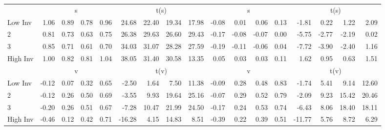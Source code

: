 \begin{table}[!ht]
\begin{tabular}{lrrrrrrrrrrrrrrrr}
  
    
      & \multicolumn{4}{c}{s} & \multicolumn{4}{c}{t(s)}
    
      & \multicolumn{4}{c}{s} & \multicolumn{4}{c}{t(s)}
    
    \\
      \cmidrule(r){2-5} \cmidrule(r){6-9} \cmidrule(r){10-13} \cmidrule(r){14-17}

    Low Inv   & 1.06  & 0.89  & 0.78  & 0.96  & 24.68  & 22.40  & 19.34  & 17.98  & -0.08  & 0.01  & 0.06  & 0.13  & -1.81  & 0.22  & 1.22  & 2.09  \\
           2  & 0.81  & 0.73  & 0.63  & 0.75  & 26.38  & 29.63  & 26.60  & 29.43  & -0.17  & -0.08  & -0.07  & 0.00  & -5.75  & -2.77  & -2.19  & 0.02  \\
           3  & 0.85  & 0.71  & 0.61  & 0.70  & 34.03  & 31.07  & 28.28  & 27.59  & -0.19  & -0.11  & -0.06  & 0.04  & -7.72  & -3.90  & -2.40  & 1.16  \\
    High Inv  & 1.00  & 0.82  & 0.81  & 1.04  & 38.05  & 31.40  & 30.58  & 13.35  & 0.05  & 0.03  & 0.03  & 0.11  & 1.62  & 0.95  & 0.63  & 1.51  \\

  
    
      & \multicolumn{4}{c}{v} & \multicolumn{4}{c}{t(v)}
    
      & \multicolumn{4}{c}{v} & \multicolumn{4}{c}{t(v)}
    
    \\
      \cmidrule(r){2-5} \cmidrule(r){6-9} \cmidrule(r){10-13} \cmidrule(r){14-17}

    Low Inv   & -0.12  & 0.07  & 0.32  & 0.65  & -2.50  & 1.64  & 7.50  & 11.38  & -0.09  & 0.28  & 0.48  & 0.83  & -1.74  & 5.41  & 9.14  & 12.60  \\
           2  & -0.12  & 0.26  & 0.50  & 0.69  & -3.55  & 9.93  & 19.64  & 25.16  & -0.07  & 0.29  & 0.52  & 0.79  & -2.09  & 9.23  & 15.42  & 20.46  \\
           3  & -0.20  & 0.26  & 0.51  & 0.67  & -7.28  & 10.47  & 21.99  & 24.50  & -0.17  & 0.24  & 0.53  & 0.74  & -6.43  & 8.06  & 18.40  & 18.11  \\
    High Inv  & -0.46  & 0.12  & 0.42  & 0.71  & -16.28  & 4.15  & 14.83  & 8.51  & -0.39  & 0.22  & 0.39  & 0.51  & -11.77  & 5.76  & 8.72  & 6.29  \\

  

  \bottomrule
\end{tabular}
\label{tbl:32_Size_BM_Prior_FF1993}
\end{table}